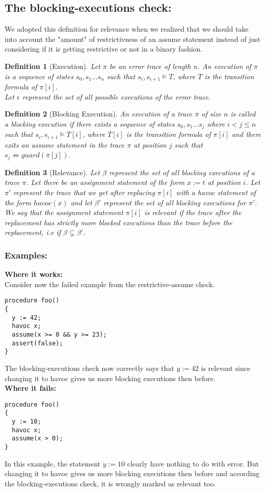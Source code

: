 \documentclass{article}
\newcommand{\limp}{\Rightarrow}
\newtheorem{mydef}{Definition}
\begin{document}
\subsection{The blocking-executions check:}
We adopted this definition for relevance when we realized that we should take into account the "amount" of restrictivness of an assume statement instead of just considering if it is getting restrictive or not in a binary fashion.
\begin{mydef}[Execution]\label{mydef:execution_definition}
Let $\pi$ be an error trace of length $n$. An execution of $\pi$ is a sequence of states $s_0, s_1...s_n$ such that $s_i, s_{i+1} \models T$, where $T$ is the transition formula of $\pi[i]$. \\
Let $\epsilon$ represent the set of all possible executions of the error trace.
\end{mydef}

\begin{mydef}[Blocking Execution]\label{mydef:blockingexecution_definition}
An execution of a trace $\pi$ of size $n$ is called a blocking execution if there exists a sequence of states $s_0, s_1...s_j$ where $i<j \leq n$ such that $s_i, s_{i+1} \models T[i]$, where $T[i]$ is the transition formula of $\pi[i]$ and there exits an assume statement in the trace $\pi$ at position $j$ such that $s_{j} \not \limp guard(\pi[j])$.
\end{mydef}

\begin{mydef}[Relevance]\label{mydef:relevancy_definition}
Let $\beta$ represent the set of all blocking executions of a trace $\pi$. Let there be an assignment statement of the form $x:=t$ at position $i$. Let $\pi'$ represent the trace that we get after replacing $\pi[i]$ with a havoc statement of the form $havoc(x)$ and let $\beta'$ represent the set of all blocking executions for $\pi'$.\\
We say that the assignment statement $\pi[i]$ is relevant if the trace after the replacement has strictly more blocked executions than the trace before the replacement, i.e if $\beta \subsetneq \beta'$. 
\end{mydef}
\subsubsection{Examples:}
\textbf{Where it works:}\\
Consider now the failed example from the restrictive-assume check. 
\begin{lstlisting}
procedure foo()
{
  y := 42;
  havoc x;
  assume(x >= 0 && y >= 23);
  assert(false);
}
\end{lstlisting}
The blocking-executions check now correctly says that $y:=42$ is relevant since changing it to havoc gives us more blocking executions then before.\\
\textbf{Where it fails:}
\begin{lstlisting}
procedure foo()
{
  y := 10;
  havoc x;
  assume(x > 0);
}
\end{lstlisting}
In this example, the statement $y:=10$ clearly have nothing to do with error. But changing it to havoc gives us more blocking executions then before and according the blocking-executions check, it is wrongly marked as relevant too. 
\newpage
\end{document}
